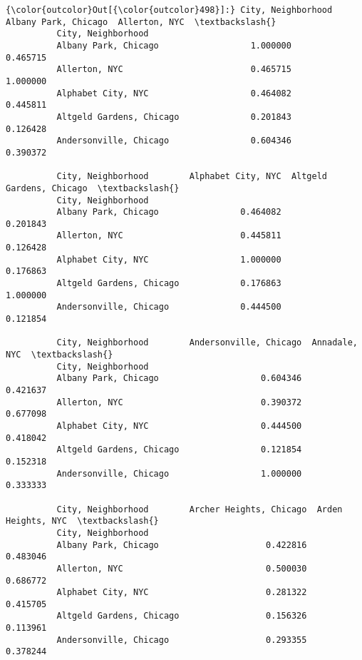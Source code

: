 \documentclass[11pt]{article}
\begin{document}
\begin{Verbatim}[commandchars=\\\{\}]
{\color{outcolor}Out[{\color{outcolor}498}]:} City, Neighborhood        Albany Park, Chicago  Allerton, NYC  \textbackslash{}
          City, Neighborhood                                              
          Albany Park, Chicago                  1.000000       0.465715   
          Allerton, NYC                         0.465715       1.000000   
          Alphabet City, NYC                    0.464082       0.445811   
          Altgeld Gardens, Chicago              0.201843       0.126428   
          Andersonville, Chicago                0.604346       0.390372   
          
          City, Neighborhood        Alphabet City, NYC  Altgeld Gardens, Chicago  \textbackslash{}
          City, Neighborhood                                                       
          Albany Park, Chicago                0.464082                  0.201843   
          Allerton, NYC                       0.445811                  0.126428   
          Alphabet City, NYC                  1.000000                  0.176863   
          Altgeld Gardens, Chicago            0.176863                  1.000000   
          Andersonville, Chicago              0.444500                  0.121854   
          
          City, Neighborhood        Andersonville, Chicago  Annadale, NYC  \textbackslash{}
          City, Neighborhood                                                
          Albany Park, Chicago                    0.604346       0.421637   
          Allerton, NYC                           0.390372       0.677098   
          Alphabet City, NYC                      0.444500       0.418042   
          Altgeld Gardens, Chicago                0.121854       0.152318   
          Andersonville, Chicago                  1.000000       0.333333   
          
          City, Neighborhood        Archer Heights, Chicago  Arden Heights, NYC  \textbackslash{}
          City, Neighborhood                                                      
          Albany Park, Chicago                     0.422816            0.483046   
          Allerton, NYC                            0.500030            0.686772   
          Alphabet City, NYC                       0.281322            0.415705   
          Altgeld Gardens, Chicago                 0.156326            0.113961   
          Andersonville, Chicago                   0.293355            0.378244   
          

\end{Verbatim}
\end{document}
